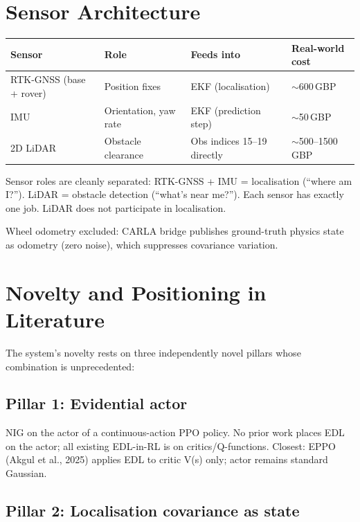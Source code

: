 \documentclass[11pt,a4paper]{article}
\begin{document}
\section{Sensor Architecture}

\begin{center}
\begin{tabular}{llll}
\toprule
Sensor & Role & Feeds into & Real-world cost \\
\midrule
RTK-GNSS (base + rover) & Position fixes & EKF (localisation) & $\sim$600\,GBP \\
IMU & Orientation, yaw rate & EKF (prediction step) & $\sim$50\,GBP \\
2D LiDAR & Obstacle clearance & Obs indices 15--19 directly & $\sim$500--1500\,GBP \\
\bottomrule
\end{tabular}
\end{center}

Sensor roles are cleanly separated: RTK-GNSS + IMU = localisation
(``where am I?''). LiDAR = obstacle detection (``what's near me?'').
Each sensor has exactly one job. LiDAR does not participate in localisation.

Wheel odometry excluded: CARLA bridge publishes ground-truth physics state
as odometry (zero noise), which suppresses covariance variation.

\section{Novelty and Positioning in Literature}

The system's novelty rests on three independently novel pillars whose
combination is unprecedented:

\subsection{Pillar 1: Evidential actor}

NIG on the actor of a continuous-action PPO policy. No prior work places
EDL on the actor; all existing EDL-in-RL is on critics/Q-functions.
Closest: EPPO (Akgul et al., 2025) applies EDL to critic V(s) only;
actor remains standard Gaussian.

\subsection{Pillar 2: Localisation covariance as state}
\end{document}
